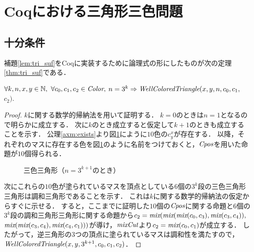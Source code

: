 \section{Coqにおける三角形三色問題}

\subsection{十分条件}
補題\ref{lem:tri_suf}をCoqに実装するために論理式の形にしたものが次の定理\ref{thm:tri_suf}である．
\begin{thm}[十分条件] \label{thm:tri_suf}
  $\forall k, n, x, y \in \mathbb{N},$ $\forall c_0, c_1, c_2 \in \textit{Color},$ $n = 3 ^ k \Rightarrow \textit{WellColoredTriangle}(x,y,n,c_0,c_1,$ $c_2)$.
\end{thm}
\begin{proof}
  $k$に関する数学的帰納法を用いて証明する．
  $k=0$のときは$n=1$となるので明らかに成立する．
  次に$k$のとき成立すると仮定して$k+1$のときも成立することを示す．
  公理\ref{axm:exists}より図\ref{fig:suf_steps}にように$10$色の$c^x_y$が存在する．
  以降，それぞれのマスに存在する色を図\ref{fig:suf_steps}のように名前をつけておくと，$\textit{Cpos}$を用いた命題が$10$個得られる．
  \begin{figure}[h]
    \centering
    
    \caption{三色三角形（$n=3^{k+1}$のとき）}
    \label{fig:suf_steps}
  \end{figure} 
  次にこれらの$10$色が塗られているマスを頂点としている$6$個の$3^k$段の三色三角形三角形は調和三角形であることを示す．
  これは$k$に関する数学的帰納法の仮定からすぐに示せる．
  すると，ここまでに証明した$10$個の$\textit{Cpos}$に関する命題と$6$個の$3^k$段の調和三角形三角形に関する命題から$c_2 = \textit{mix}(\textit{mix}(\textit{mix}(c_0,c_3),\textit{mix}(c_3,c_4)),$ $\textit{mix}(\textit{mix}(c_3,c_4),\textit{mix}(c_4,c_1)))$が導け，$\textit{mixCut}$より$c_2=\textit{mix}(c_0,c_1)$が成立する．
  したがって，逆三角形の$3$つの頂点に塗られているマスは調和性を満たすので，$\textit{WellColoredTriangle}(x,y,3^{k+1},c_0,c_1,c_2)$．
\end{proof}


